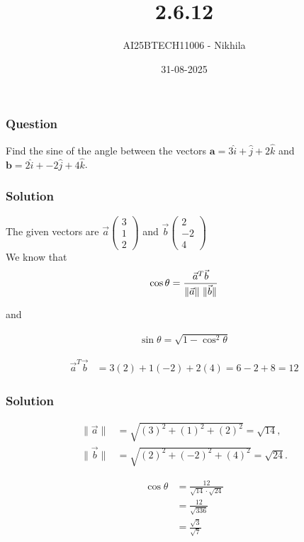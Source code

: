 \documentclass{beamer}
\title{2.6.12 }
\author{AI25BTECH11006 - Nikhila}
\date{31-08-2025}
\begin{document}
\frame{\titlepage}

\begin{frame}
\frametitle{Question}
Find the sine of the angle between the vectors $\textbf{a} = 3\hat{i} + \hat{j} + 2\hat{k}$ and $\textbf{b} = 2\hat{i} + -2\hat{j} + 4\hat{k}$.\\
 \end{frame}




\begin{frame}
\frametitle{Solution}
The given vectors are $\vec{a}\begin{pmatrix}3 \\ 1 \\ 2\end{pmatrix} $ and $  \vec{b}\begin{pmatrix}2 \\ -2 \\ 4\end{pmatrix}$ \\ 

We know that
\begin{align}
\cos\theta = \frac{\vec{a}^T \vec{b}}{\lVert \vec{a} \rVert \hspace{0.3em} \lVert \vec{b} \rVert}
\end{align}

and

\begin{align}
\sin\theta = \sqrt{1 - \cos^2\theta}
\end{align}

\begin{align}
\vec{a}^T \vec{b} &= 3(2) + 1(-2) + 2(4) = 6 - 2 + 8 = 12
\end{align}

\end{frame}


\begin{frame}
\frametitle{Solution}

\begin{align}
\lVert \vec{a} \rVert &= \sqrt{(3)^2 + (1)^2 + (2)^2} = \sqrt{14}, \\
\lVert \vec{b} \rVert &= \sqrt{(2)^2 + (-2)^2 + (4)^2} = \sqrt{24}.
\end{align}

\begin{align}
\cos\theta &= \frac{12}{\sqrt{14} \cdot \sqrt{24}} \\
&= \frac{12}{\sqrt{336}} \\
&= \frac{\sqrt{3}}{\sqrt{7}}
\end{align}

\end{frame}
\end{document}
